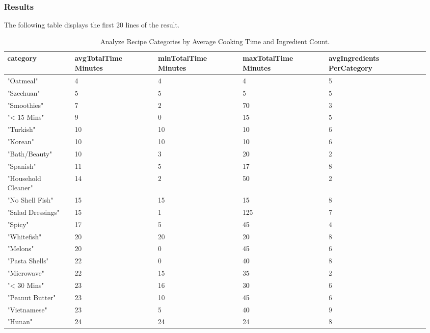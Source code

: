 \begin{enumerate}
    \subsubsection{Results}
    The following table displays the first 20 lines of the result.
\begin{table}[h!]
\small %
\centering
\setlength{\tabcolsep}{4pt} %
\begin{tabular}{p{3cm}p{3cm}p{3cm}p{3cm}p{3cm}}
\toprule
\textbf{category} & \textbf{avgTotalTime Minutes} & \textbf{minTotalTime Minutes} & \textbf{maxTotalTime Minutes} & \textbf{avgIngredients PerCategory} \\
\midrule
"Oatmeal"            & 4  & 4   & 4   & 5 \\
"Szechuan"           & 5  & 5   & 5   & 5 \\
"Smoothies"          & 7  & 2   & 70  & 3 \\
"< 15 Mins"          & 9  & 0   & 15  & 5 \\
"Turkish"            & 10 & 10  & 10  & 6 \\
"Korean"             & 10 & 10  & 10  & 6 \\
"Bath/Beauty"        & 10 & 3   & 20  & 2 \\
"Spanish"            & 11 & 5   & 17  & 8 \\
"Household Cleaner"  & 14 & 2   & 50  & 2 \\
"No Shell Fish"      & 15 & 15  & 15  & 8 \\
"Salad Dressings"    & 15 & 1   & 125 & 7 \\
"Spicy"              & 17 & 5   & 45  & 4 \\
"Whitefish"          & 20 & 20  & 20  & 8 \\
"Melons"             & 20 & 0   & 45  & 6 \\
"Pasta Shells"       & 22 & 0   & 40  & 8 \\
"Microwave"          & 22 & 15  & 35  & 2 \\
"< 30 Mins"          & 23 & 16  & 30  & 6 \\
"Peanut Butter"      & 23 & 10  & 45  & 6 \\
"Vietnamese"         & 23 & 5   & 40  & 9 \\
"Hunan"              & 24 & 24  & 24  & 8 \\
\bottomrule
\end{tabular}
\caption{Analyze Recipe Categories by Average Cooking Time and Ingredient Count.}
\label{tab:category_data}
\end{table}

\end{enumerate}
